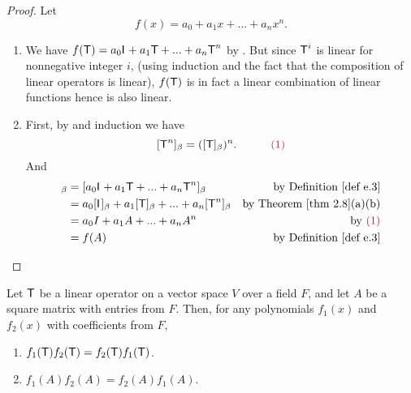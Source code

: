 \begin{proof}
Let
\[
    f(x) = a_0 + a_1 x + ... + a_n x^n.
\]
\begin{enumerate}
\item We have \(f(\textsf{T}) = a_0 \textsf{I}_{_{}} + a_1 \textsf{T} + ... + a_n \textsf{T}^n\) by .
But since \(\textsf{T}^i\) is linear for nonnegative integer \(i\), (using induction and the fact that the composition of linear operators is linear), \(f(\textsf{T})\) is in fact a linear combination of linear functions hence is also linear.

\item
First, by  and induction we have
\[
     [\T^n]_{\beta} = ([\T]_{\beta})^n. \quad \quad \quad \MAROON{(1)}
\]
And
\begin{align*}
    [f(\T)]_{\beta} & = [a_0 \ITRAN{} + a_1 \T + ... + a_n \T^n]_{\beta} & \text{by \DEF{e.3}} \\
        & = a_0 [\ITRAN{}]_{\beta} + a_1 [\T]_{\beta} + ... + a_n [\T^n]_{\beta} & \text{by \THM{2.8}(a)(b)} \\
        & = a_0 I + a_1 A + ... + a_n A^n & \text{by \MAROON{(1)}} \\
        & = f(A) & \text{by \DEF{e.3}}
\end{align*}
\end{enumerate}
\end{proof}

\begin{appendix theorem} \label{thm e.4}
Let \(\textsf{T}\) be a linear operator on a vector space \(V\) over a field \(F\), and let \(A\) be a square matrix with entries from \(F\).
Then, for any polynomials \(f_1(x)\) and \(f_2(x)\) with coefficients from \(F\),
\begin{enumerate}
\item \(f_1(\textsf{T})f_2(\textsf{T}) = f_2(\textsf{T})f_1(\textsf{T})\).
\item \(f_1(A)f_2(A) = f_2(A)f_1(A)\).
\end{enumerate}
\end{appendix theorem}

